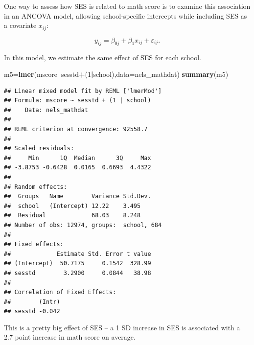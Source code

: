 \documentclass[ignorenonframetext,]{beamer}
\newenvironment{Shaded}{\begin{snugshade}}{\end{snugshade}}
\newcommand{\KeywordTok}[1]{\textcolor[rgb]{0.13,0.29,0.53}{\textbf{#1}}}
\newcommand{\DataTypeTok}[1]{\textcolor[rgb]{0.13,0.29,0.53}{#1}}
\newcommand{\DecValTok}[1]{\textcolor[rgb]{0.00,0.00,0.81}{#1}}
\newcommand{\OperatorTok}[1]{\textcolor[rgb]{0.81,0.36,0.00}{\textbf{#1}}}
\newcommand{\NormalTok}[1]{#1}
\begin{document}
\begin{frame}{}

One way to assess how SES is related to math score is to examine this
association in an ANCOVA model, allowing school-specific intercepts
while including SES as a covariate \(x_{ij}\):

\[y_{ij}=\beta_{0j}+\beta_1x_{ij} + \varepsilon_{ij}.\]

In this model, we estimate the same effect of SES for each school.

\end{frame}

\begin{frame}[fragile]{}

\begin{Shaded}
\begin{Highlighting}[]
\NormalTok{m5=}\KeywordTok{lmer}\NormalTok{(mscore}\OperatorTok{~}\NormalTok{sesstd}\OperatorTok{+}\NormalTok{(}\DecValTok{1}\OperatorTok{|}\NormalTok{school),}\DataTypeTok{data=}\NormalTok{nels_mathdat)}
\KeywordTok{summary}\NormalTok{(m5)}
\end{Highlighting}
\end{Shaded}

\begin{verbatim}
## Linear mixed model fit by REML ['lmerMod']
## Formula: mscore ~ sesstd + (1 | school)
##    Data: nels_mathdat
## 
## REML criterion at convergence: 92558.7
## 
## Scaled residuals: 
##     Min      1Q  Median      3Q     Max 
## -3.8753 -0.6428  0.0165  0.6693  4.4322 
## 
## Random effects:
##  Groups   Name        Variance Std.Dev.
##  school   (Intercept) 12.22    3.495   
##  Residual             68.03    8.248   
## Number of obs: 12974, groups:  school, 684
## 
## Fixed effects:
##             Estimate Std. Error t value
## (Intercept)  50.7175     0.1542  328.99
## sesstd        3.2900     0.0844   38.98
## 
## Correlation of Fixed Effects:
##        (Intr)
## sesstd -0.042
\end{verbatim}

This is a pretty big effect of SES -- a 1 SD increase in SES is
associated with a 2.7 point increase in math score on average.

\end{frame}
\end{document}
